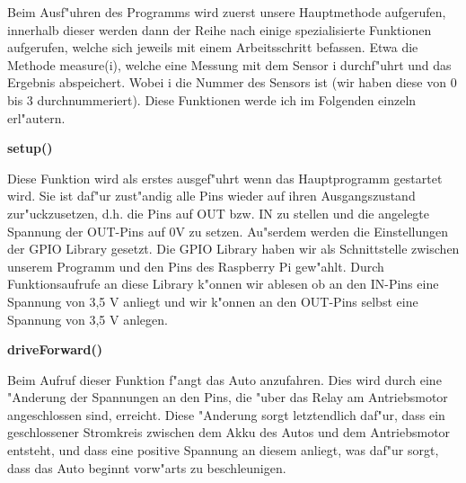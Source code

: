 \documentclass[a4paper,12pt]{article}
\begin{document}
\medskip

Beim Ausf"uhren des Programms wird zuerst unsere Hauptmethode aufgerufen, innerhalb dieser werden dann der Reihe nach einige spezialisierte Funktionen aufgerufen, welche sich jeweils mit einem Arbeitsschritt befassen.
Etwa die Methode measure(i), welche eine Messung mit dem Sensor i durchf"uhrt und das Ergebnis abspeichert.
Wobei i die Nummer des Sensors ist (wir haben diese von 0 bis 3 durchnummeriert).
Diese Funktionen werde ich im Folgenden einzeln erl"autern.

\medskip

\textbf{setup()}

Diese Funktion wird als erstes ausgef"uhrt wenn das Hauptprogramm gestartet wird.
Sie ist daf"ur zust"andig alle Pins wieder auf ihren Ausgangszustand zur"uckzusetzen, d.h. die Pins auf OUT bzw. IN zu stellen und die angelegte Spannung der OUT-Pins auf 0V zu setzen.
Au"serdem werden die Einstellungen der GPIO Library gesetzt.
Die GPIO Library haben wir als Schnittstelle zwischen unserem Programm und den Pins des Raspberry Pi gew"ahlt.
Durch Funktionsaufrufe an diese Library k"onnen wir ablesen ob an den IN-Pins eine Spannung von 3,5 V anliegt und wir k"onnen an den OUT-Pins selbst eine Spannung von 3,5 V anlegen.

\medskip

\textbf{driveForward()}

Beim Aufruf dieser Funktion f"angt das Auto anzufahren.
Dies wird durch eine "Anderung der Spannungen an den Pins, die "uber das Relay am Antriebsmotor angeschlossen sind, erreicht.
Diese "Anderung sorgt letztendlich daf"ur, dass ein geschlossener Stromkreis zwischen dem Akku des Autos und dem Antriebsmotor entsteht, und dass eine positive Spannung an diesem anliegt, was daf"ur sorgt, dass das Auto beginnt vorw"arts zu beschleunigen.

\medskip
\end{document}
